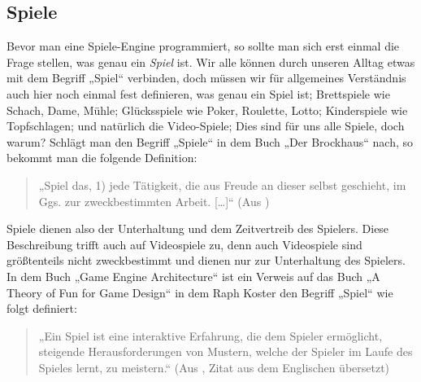 \subsection{Spiele}	

Bevor man eine Spiele-Engine programmiert, so sollte man sich erst einmal die Frage stellen, was genau ein \textit{Spiel} ist. Wir alle können durch unseren Alltag etwas mit dem Begriff „Spiel“ verbinden, doch müssen wir für allgemeines Verständnis auch hier noch einmal fest definieren, was genau ein Spiel ist;
Brettspiele wie Schach, Dame, Mühle; Glücksspiele wie Poker, Roulette, Lotto; Kinderspiele wie Topfschlagen; und natürlich die Video-Spiele; Dies sind für uns alle Spiele, doch warum?
Schlägt man den Begriff „Spiele“ in dem Buch „Der Brockhaus“ nach, so bekommt man die folgende Definition:

\begin{quote}
	„Spiel das, 1) jede Tätigkeit, die aus Freude an dieser selbst geschieht, im Ggs. zur zweckbestimmten Arbeit. […]“ (Aus \cite{brockhaus})
\end{quote}

Spiele dienen also der Unterhaltung und dem Zeitvertreib des Spielers.
Diese Beschreibung trifft auch auf Videospiele zu, denn auch Videospiele sind größtenteils nicht zweckbestimmt und dienen nur zur Unterhaltung des Spielers.
In dem Buch „Game Engine Architecture“ \cite{gea} ist ein Verweis auf das Buch „A Theory
of Fun for Game Design“ in dem Raph Koster den Begriff „Spiel“ wie folgt definiert:

\begin{quote}
	„Ein Spiel ist eine interaktive Erfahrung, die dem Spieler ermöglicht, steigende Herausforderungen von Mustern, welche der Spieler im Laufe des Spieles lernt, zu meistern.“
	(Aus \cite{theoryoffun}, Zitat aus dem Englischen übersetzt)
\end{quote}